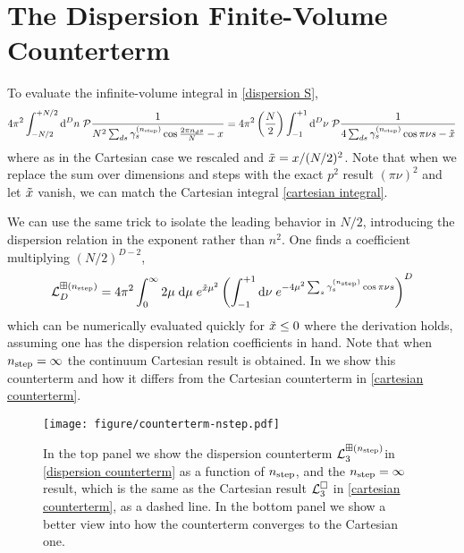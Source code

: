 \section{The Dispersion \Luscher Finite-Volume Counterterm}\label{sec:counterterm/dispersion}

To evaluate the infinite-volume integral in \eqref{dispersion S},
\begin{equation}
    4\pi^2 \int_{-N/2}^{+N/2} \mathrm{d}^Dn\; \mathcal{P} \frac{1}{N^2 \sum_{ds} \gamma^{({n_\text{step}})}_s \cos \frac{2\pi n_d s}{N} - x}
    =
    4\pi^2 \left(\frac{N}{2}\right) \int_{-1}^{+1} \mathrm{d}^D\nu\; \mathcal{P} \frac{1}{4\sum_{ds} \gamma^{({n_\text{step}})}_s \cos \pi \nu s - \tilde{x}}
\end{equation}
where as in the Cartesian case we rescaled and $\tilde{x} = x/(N/2)^2$.
Note that when we replace the sum over dimensions and steps with the exact $p^2$ result $(\pi \nu)^2$ and let $\tilde{x}$ vanish, we can match the Cartesian integral \eqref{cartesian integral}.

We can use the same trick to isolate the leading behavior in $N/2$, introducing the dispersion relation in the exponent rather than $n^2$.
One finds a coefficient multiplying $(N/2)^{D-2}$,
\begin{equation}
    \label{eq:dispersion counterterm}
    \mathcal{L}^{\boxplus ({n_\text{step}})}_D = 4 \pi^2 \int_{0}^{\infty} 2\mu\; \mathrm{d}\mu\; e^{\tilde{x}\mu^2}\left(\int_{-1}^{+1} \mathrm{d}\nu\; e^{-4\mu^2 \sum_s \gamma_s^{({n_\text{step}})} \cos \pi \nu s}\right)^D
\end{equation}
which can be numerically evaluated quickly for $\tilde{x}\leq0$ where the derivation holds, assuming one has the dispersion relation coefficients in hand.
Note that when ${n_\text{step}}=\infty$ the continuum Cartesian result is obtained.
In  we show this counterterm and how it differs from the Cartesian counterterm in \eqref{cartesian counterterm}.

\begin{figure}
    \texttt{[image: figure/counterterm-nstep.pdf]}
    \caption{In the top panel we show the dispersion counterterm $\mathcal{L}^{\boxplus ({n_\text{step}})}_{3}$in \eqref{dispersion counterterm} as a function of ${n_\text{step}}$, and the ${n_\text{step}}=\infty$ result, which is the same as the Cartesian result $\mathcal{L}^{\square}_3$ in \eqref{cartesian counterterm}, as a dashed line.  In the bottom panel we show a better view into how the counterterm converges to the Cartesian one.
    }
    \label{fig:nstep counterterm}
\end{figure}
